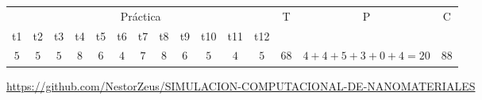 \documentclass[letterpaper, 10 pt, conference]{article}
\begin{document}
\begin{scshape}
\begin{center}
\begin{table}[ht]
\begin{tabular}{|c|c|c|c|c|c|c|c|c|c|c|c|c|c|c|} 
 \hline
 \multicolumn{12}{|c|}{Práctica} & \multirow{2}{*}{T} & \multirow{2}{*}{P} & \multirow{2}{*}{C} \\
 \cline{1-12}
 t1 & t2 & t3 & t4 & t5 & t6 & t7 & t8 & t9 & t10 & t11 & t12 & & & \\
 \hline
 $5$ & $5$ & $5$ & $8$ & $6$ & $4$ & $7$ & $8$ & $6$ & $5$ & $4$ & $5$ & \multicolumn{1}{|c|}{68} & $4+4+5+3+0+4=20$ & \multicolumn{1}{|c|}{88}\\
 \hline
\end{tabular}
\label{Cuadro3}
\end{table}

	\url{https://github.com/NestorZeus/SIMULACION-COMPUTACIONAL-DE-NANOMATERIALES}
	\vfill
\end{center}
\end{scshape}
\end{document}
